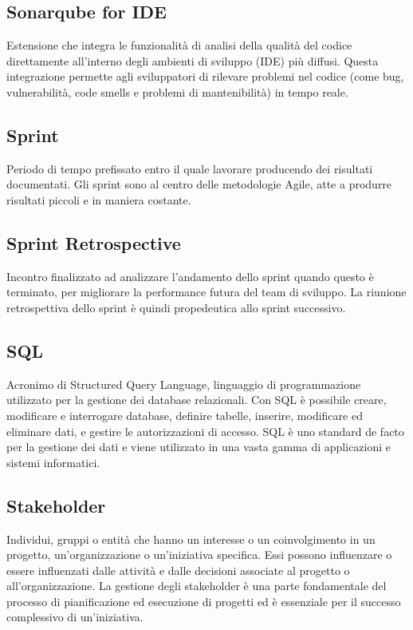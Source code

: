 \subsection*{Sonarqube for IDE}
Estensione che integra le funzionalità di analisi della qualità del codice direttamente all'interno degli ambienti di sviluppo (IDE) più diffusi.
Questa integrazione permette agli sviluppatori di rilevare problemi nel codice (come bug, vulnerabilità, code smells e problemi di mantenibilità) in tempo reale.

\hypertarget{sec:Sprint}{}
\subsection*{Sprint}
Periodo di tempo prefissato entro il quale lavorare producendo dei risultati documentati. Gli sprint sono al centro delle metodologie Agile, atte a produrre 
risultati piccoli e in maniera costante.

\hypertarget{sec:sprint_reptrospective}{}
\subsection*{Sprint Retrospective}
Incontro finalizzato ad analizzare l’andamento dello sprint quando questo è terminato, per migliorare la performance futura del team di sviluppo. La 
riunione retrospettiva dello sprint è quindi propedeutica allo sprint successivo.

\hypertarget{sec:sql}{}
\subsection*{SQL}
Acronimo di Structured Query Language, linguaggio di programmazione utilizzato per la gestione dei database relazionali. Con SQL è possibile creare,
modificare e interrogare database, definire tabelle, inserire, modificare ed eliminare dati, e gestire le autorizzazioni di accesso. SQL è uno standard
de facto per la gestione dei dati e viene utilizzato in una vasta gamma di applicazioni e sistemi informatici.

\hypertarget{sec:stakeholder}{}
\subsection*{Stakeholder}
Individui, gruppi o entità che hanno un interesse o un coinvolgimento in un progetto, un’organizzazione o un’iniziativa specifica. Essi possono influenzare 
o essere influenzati dalle attività e dalle decisioni associate al progetto o all’organizzazione. La gestione degli stakeholder è una parte fondamentale del 
processo di pianificazione ed esecuzione di progetti ed è essenziale per il successo complessivo di un’iniziativa.


